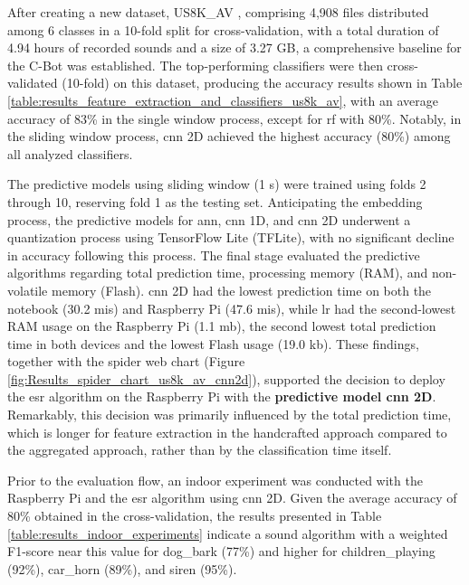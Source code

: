 After creating a new dataset, US8K\_AV \cite{florentino2024}, comprising 4,908 files distributed among 6 classes in a 10-fold split for cross-validation, with a total duration of 4.94 hours of recorded sounds and a size of 3.27 GB, a comprehensive baseline for the C-Bot was established. The top-performing classifiers were then cross-validated (10-fold) on this dataset, producing the accuracy results shown in Table \ref{table:results_feature_extraction_and_classifiers_us8k_av}, with an average accuracy of 83\% in the single window process, except for \gls{rf} with 80\%. Notably, in the sliding window process, \gls{cnn} 2D achieved the highest accuracy (80\%) among all analyzed classifiers.

The predictive models using sliding window (1 \gls{s}) were trained using folds 2 through 10, reserving fold 1 as the testing set. Anticipating the embedding process, the predictive models for \gls{ann}, \gls{cnn} 1D, and \gls{cnn} 2D underwent a quantization process using TensorFlow Lite (TFLite), with no significant decline in accuracy following this process. The final stage evaluated the predictive algorithms regarding total prediction time, processing memory (RAM), and non-volatile memory (Flash). \gls{cnn} 2D had the lowest prediction time on both the notebook (30.2 \gls{mi}\gls{s}) and Raspberry Pi (47.6 \gls{mi}\gls{s}), while \gls{lr} had the second-lowest RAM usage on the Raspberry Pi (1.1 \gls{m}\gls{b}), the second lowest total prediction time in both devices and the lowest Flash usage (19.0 \gls{k}\gls{b}). These findings, together with the spider web chart (Figure \ref{fig:Results_spider_chart_us8k_av_cnn2d}), supported the decision to deploy the \gls{esr} algorithm on the Raspberry Pi with the \textbf{predictive model \gls{cnn} 2D}. Remarkably, this decision was primarily influenced by the total prediction time, which is longer for feature extraction in the handcrafted approach compared to the aggregated approach, rather than by the classification time itself.

Prior to the evaluation flow, an indoor experiment was conducted with the Raspberry Pi and the \gls{esr} algorithm using \gls{cnn} 2D. Given the average accuracy of 80\% obtained in the cross-validation, the results presented in Table \ref{table:results_indoor_experiments} indicate a sound algorithm with a weighted F1-score near this value for dog\_bark (77\%) and higher for children\_playing (92\%), car\_horn (89\%), and siren (95\%).



